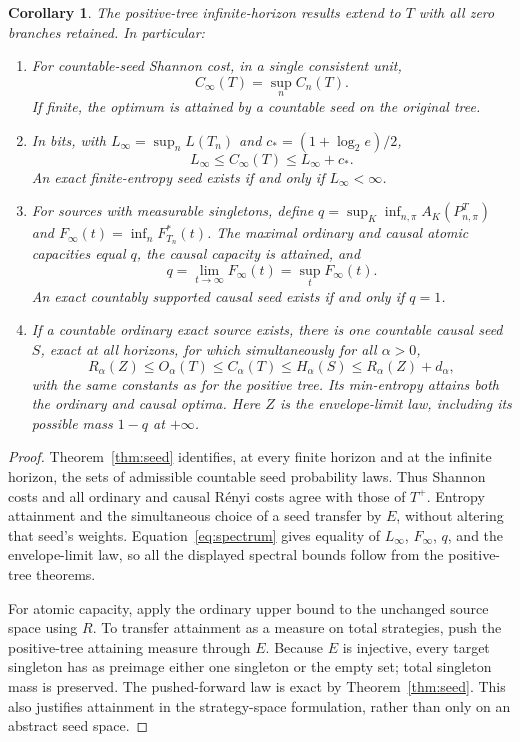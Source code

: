 \documentclass[11pt,a4paper]{article}
\newtheorem{corollary}[theorem]{Corollary}
\begin{document}
\begin{corollary}\label{cor:transfer}
The positive-tree infinite-horizon results extend to $T$ with all zero
branches retained. In particular:
\begin{enumerate}
\item For countable-seed Shannon cost, in a single consistent unit,
\[
 C_\infty(T)=\sup_n C_n(T).
\]
If finite, the optimum is attained by a countable seed on the original tree.
\item In bits, with $L_\infty=\sup_n L(T_n)$ and
$c_*=(1+\log_2e)/2$,
\[
 L_\infty\le C_\infty(T)\le L_\infty+c_*.
\]
An exact finite-entropy seed exists if and only if $L_\infty<\infty$.
\item For sources with measurable singletons, define
$q=\sup_K\inf_{n,\pi}A_K(P^T_{n,\pi})$ and
$F_\infty(t)=\inf_nF_{T_n}^*(t)$. The maximal ordinary and causal atomic
capacities equal $q$, the causal capacity is attained, and
\[
 q=\lim_{t\to\infty}F_\infty(t)=\sup_t F_\infty(t).
\]
An exact countably supported causal seed exists if and only if $q=1$.
\item If a countable ordinary exact source exists, there is one countable
causal seed $S$, exact at all horizons, for which simultaneously for all
$\alpha>0$,
\[
 R_\alpha(Z)\le O_\alpha(T)\le C_\alpha(T)
 \le H_\alpha(S)\le R_\alpha(Z)+d_\alpha,
\]
with the same constants as for the positive tree. Its min-entropy attains
both the ordinary and causal optima. Here $Z$ is the envelope-limit law,
including its possible mass $1-q$ at $+\infty$.
\end{enumerate}
\end{corollary}
\begin{proof}
Theorem~\ref{thm:seed} identifies, at every finite horizon and at the
infinite horizon, the sets of admissible countable seed probability laws.
Thus Shannon costs and all ordinary and causal R\'enyi costs agree with
those of $T^+$. Entropy attainment and the simultaneous choice of a seed
transfer by $E$, without altering that seed's weights.
Equation~\eqref{eq:spectrum} gives equality of $L_\infty$, $F_\infty$,
$q$, and the envelope-limit law, so all the displayed spectral bounds
follow from the positive-tree theorems.

For atomic capacity, apply the ordinary upper bound to the unchanged
source space using $R$. To transfer attainment as a measure on total
strategies, push the positive-tree attaining measure through $E$.
Because $E$ is injective, every target singleton has as preimage either
one singleton or the empty set; total singleton mass is preserved.
The pushed-forward law is exact by Theorem~\ref{thm:seed}. This also
justifies attainment in the strategy-space formulation, rather than
only on an abstract seed space.
\end{proof}
\end{document}
